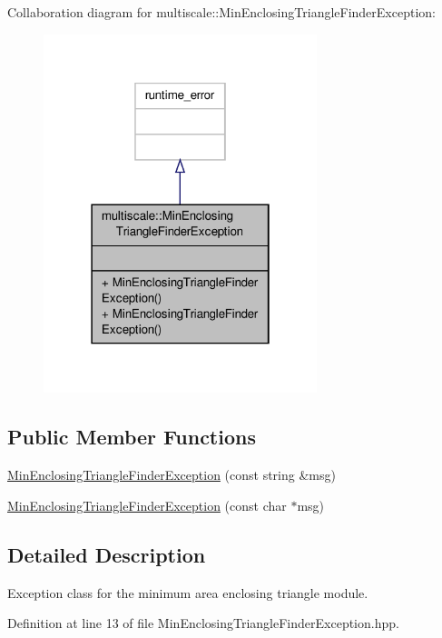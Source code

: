 Collaboration diagram for multiscale\-:\-:Min\-Enclosing\-Triangle\-Finder\-Exception\-:\nopagebreak
\begin{figure}[H]
\begin{center}
\leavevmode
\includegraphics[width=226pt]{classmultiscale_1_1MinEnclosingTriangleFinderException__coll__graph}
\end{center}
\end{figure}
\subsection*{Public Member Functions}
\begin{DoxyCompactItemize}
\item 
\hyperlink{classmultiscale_1_1MinEnclosingTriangleFinderException_a4a83fc394b2c31092e51cb4d43f45d5e}{Min\-Enclosing\-Triangle\-Finder\-Exception} (const string \&msg)
\item 
\hyperlink{classmultiscale_1_1MinEnclosingTriangleFinderException_a21a9dd80a171daa204b58b33fd5fbd5e}{Min\-Enclosing\-Triangle\-Finder\-Exception} (const char $\ast$msg)
\end{DoxyCompactItemize}


\subsection{Detailed Description}
Exception class for the minimum area enclosing triangle module. 

Definition at line 13 of file Min\-Enclosing\-Triangle\-Finder\-Exception.\-hpp.



